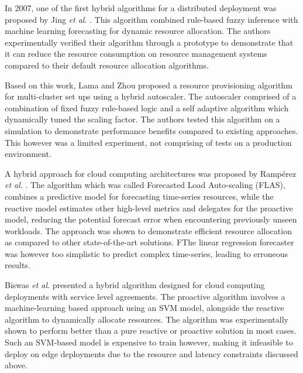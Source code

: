 In 2007, one of the first hybrid algorithms for a distributed deployment was proposed by Jing \textit{et al}. \cite{xu2007use}. This algorithm combined rule-based fuzzy inference with machine learning forecasting for dynamic resource allocation. The authors experimentally verified their algorithm through a prototype to demonstrate that it can reduce the resource consumption on resource management systems compared to their default resource allocation algorithms.\par

Based on this work, Lama and Zhou \cite{lama2009efficient} proposed a resource provisioning algorithm for multi-cluster set ups using a hybrid autoscaler. The autoscaler comprised of a combination of fixed fuzzy rule-based logic and a self adaptive algorithm which dynamically tuned the scaling factor. The authors tested this algorithm on a simulation to demonstrate performance benefits compared to existing approaches. This however was a limited experiment, not comprising of tests on a production environment.\par

A hybrid approach for cloud computing architectures was proposed by Ramp{\'e}rez \textit{et al}. \cite{ramperez2021flas}. The algorithm which was called Forecasted Load Auto-scaling (FLAS), combines a predictive model for forecasting time-series resources, while the reactive model estimates other high-level metrics and delegates for the proactive model, reducing the potential forecast error when encountering previously unseen workloads. The approach was shown to demonstrate efficient resource allocation as compared to other state-of-the-art solutions. FThe linear regression forecaster was however too simplistic to predict complex time-series, leading to erroneous results.\par

Biswas \textit{et al}. \cite{biswas2017hybrid} presented a hybrid algorithm designed for cloud computing deployments with service level agreements. The proactive algorithm involves a machine-learning based approach using an SVM model, alongside the reactive algorithm to dynamically allocate resources. The algorithm was experimentally shown to perform better than a pure reactive or proactive solution in most cases. Such an SVM-based model is expensive to train however, making it infeasible to deploy on edge deployments due to the resource and latency constraints discussed above.\par

